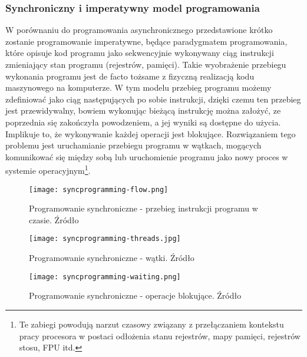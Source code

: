 \subsubsection{Synchroniczny i imperatywny model programowania}

W porównaniu do programowania asynchronicznego przedstawione krótko zostanie programowanie imperatywne, będące paradygmatem programowania\cite{programming-paradigms}, które opisuje kod programu jako sekwencyjnie wykonywany ciąg instrukcji zmieniający stan programu (rejestrów, pamięci). Takie wyobrażenie przebiegu wykonania programu jest de facto tożsame z fizyczną realizacją kodu maszynowego na komputerze. W tym modelu przebieg programu możemy zdefiniować jako ciąg następujących po sobie instrukcji, dzięki czemu ten przebieg jest przewidywalny, bowiem wykonując bieżącą instrukcję można założyć, ze poprzednia się zakończyła powodzeniem, a jej wyniki są dostępne do użycia. Implikuje to, że wykonywanie każdej operacji jest blokujące. Rozwiązaniem tego problemu jest uruchamianie przebiegu programu w wątkach, mogących komunikować się między sobą lub uruchomienie programu jako nowy proces w systemie operacyjnym\footnote{Te zabiegi powodują narzut czasowy związany z przełączaniem kontekstu pracy procesora w postaci odłożenia stanu rejestrów, mapy pamięci, rejestrów stosu, FPU itd.}.

\begin{figure}[ht]
\centering
\begin{minipage}[b]{0.45\linewidth}
  \label{fig:syncprogramming-flow}
  \centering
    \texttt{[image: syncprogramming-flow.png]}
  \caption[Programowanie synchroniczne - przebieg instrukcji programu w czasie]{Programowanie synchroniczne - przebieg instrukcji programu w czasie. Źródło \cite{programming-async}}
\end{minipage}
\end{figure}

\begin{figure}[ht]
  \centering
\begin{minipage}[b]{0.45\linewidth}
\label{fig:syncprogramming-threads}
  \centering
    \texttt{[image: syncprogramming-threads.jpg]}
  \caption[Programowanie synchroniczne - wątki]{Programowanie synchroniczne - wątki. Źródło \cite{programming-async}}
\end{minipage}
\end{figure}

\begin{figure}[ht]
  \centering
\begin{minipage}[b]{0.45\linewidth}
\label{fig:syncprogramming-waiting}
  \centering
    \texttt{[image: syncprogramming-waiting.png]}
  \caption[Programowanie synchroniczne - operacje blokujące]{Programowanie synchroniczne - operacje blokujące. Źródło \cite{programming-async}}
\end{minipage}
\end{figure}

